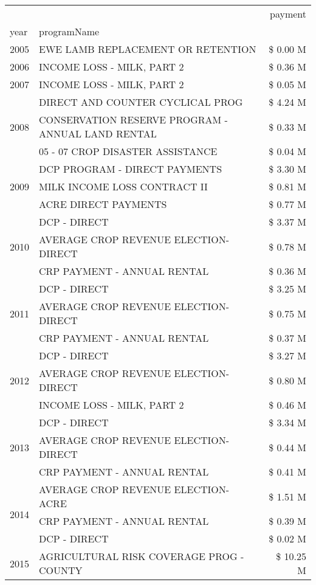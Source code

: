 \begin{tabular}{llr}
\toprule
 &  & payment \\
year & programName &  \\
\midrule
2005 & EWE LAMB REPLACEMENT OR RETENTION & \$ 0.00 M \\
\cline{1-3}
2006 & INCOME LOSS - MILK, PART 2 & \$ 0.36 M \\
\cline{1-3}
2007 & INCOME LOSS - MILK, PART 2 & \$ 0.05 M \\
\cline{1-3}
\multirow[t]{3}{*}{2008} & DIRECT AND COUNTER CYCLICAL PROG & \$ 4.24 M \\
 & CONSERVATION RESERVE PROGRAM - ANNUAL LAND RENTAL & \$ 0.33 M \\
 & 05 - 07 CROP DISASTER ASSISTANCE & \$ 0.04 M \\
\cline{1-3}
\multirow[t]{3}{*}{2009} & DCP PROGRAM - DIRECT PAYMENTS & \$ 3.30 M \\
 & MILK INCOME LOSS CONTRACT II & \$ 0.81 M \\
 & ACRE DIRECT PAYMENTS & \$ 0.77 M \\
\cline{1-3}
\multirow[t]{3}{*}{2010} & DCP - DIRECT & \$ 3.37 M \\
 & AVERAGE CROP REVENUE ELECTION-DIRECT & \$ 0.78 M \\
 & CRP PAYMENT - ANNUAL RENTAL & \$ 0.36 M \\
\cline{1-3}
\multirow[t]{3}{*}{2011} & DCP - DIRECT & \$ 3.25 M \\
 & AVERAGE CROP REVENUE ELECTION-DIRECT & \$ 0.75 M \\
 & CRP PAYMENT - ANNUAL RENTAL & \$ 0.37 M \\
\cline{1-3}
\multirow[t]{3}{*}{2012} & DCP - DIRECT & \$ 3.27 M \\
 & AVERAGE CROP REVENUE ELECTION-DIRECT & \$ 0.80 M \\
 & INCOME LOSS - MILK, PART 2 & \$ 0.46 M \\
\cline{1-3}
\multirow[t]{3}{*}{2013} & DCP - DIRECT & \$ 3.34 M \\
 & AVERAGE CROP REVENUE ELECTION-DIRECT & \$ 0.44 M \\
 & CRP PAYMENT - ANNUAL RENTAL & \$ 0.41 M \\
\cline{1-3}
\multirow[t]{3}{*}{2014} & AVERAGE CROP REVENUE ELECTION-ACRE & \$ 1.51 M \\
 & CRP PAYMENT - ANNUAL RENTAL & \$ 0.39 M \\
 & DCP - DIRECT & \$ 0.02 M \\
\cline{1-3}
\multirow[t]{3}{*}{2015} & AGRICULTURAL RISK COVERAGE PROG - COUNTY & \$ 10.25 M \\

\end{tabular}
